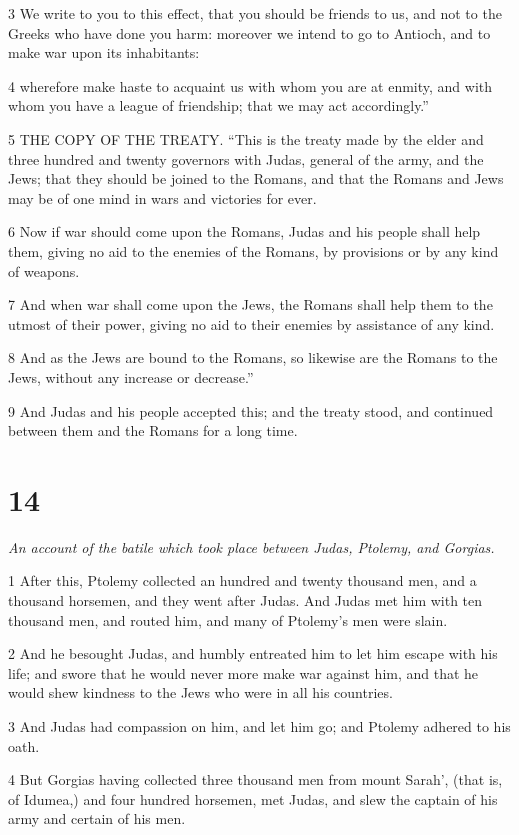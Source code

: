 3 We write to you to this effect, that you should be friends to us, and not to the Greeks who have done you harm: moreover we intend to go to Antioch, and to make war upon its inhabitants: 

4 wherefore make haste to acquaint us with whom you are at enmity, and with whom you have a league of friendship; that we may act accordingly.” 

5 THE COPY OF THE TREATY. “This is the treaty made by the elder and three hundred and twenty governors with Judas, general of the army, and the Jews; that they should be joined to the Romans, and that the Romans and Jews may be of one mind in wars and victories for ever.

6 Now if war should come upon the Romans, Judas and his people shall help them, giving no aid to the enemies of the Romans, by provisions or by any kind of weapons. 

7 And when war shall come upon the Jews, the Romans shall help them to the utmost of their power, giving no aid to their enemies by assistance of any kind. 

8 And as the Jews are bound to the Romans, so likewise are the Romans to the Jews, without any increase or decrease.” 

9 And Judas and his people accepted this; and the treaty stood, and continued between them and the Romans for a long time. 

\chapter{14}

\par \textit{An account of the batile which took place between Judas, Ptolemy, and Gorgias.}

1 After this, Ptolemy collected an hundred and twenty thousand men, and a thousand horsemen, and they went after Judas. And Judas met him with ten thousand men, and routed him, and many of Ptolemy’s men were slain. 

2 And he besought Judas, and humbly entreated him to let him escape with his life; and swore that he would never more make war against him, and that he would shew kindness to the Jews who were in all his countries. 

3 And Judas had compassion on him, and let him go; and Ptolemy adhered to his oath. 

4 But Gorgias having collected three thousand men from mount Sarah’, (that is, of Idumea,) and four hundred horsemen, met Judas, and slew the captain of his army and certain of his men. 

